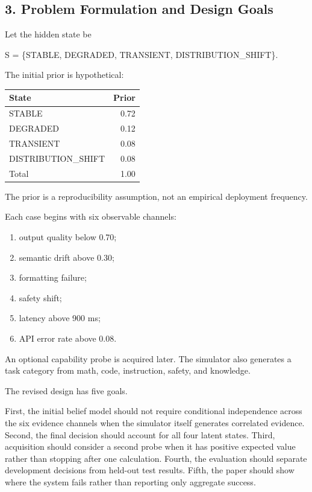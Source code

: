 \documentclass[
]{article}
\providecommand{\tightlist}{%
  \setlength{\itemsep}{0pt}\setlength{\parskip}{0pt}}
\begin{document}
\subsection{3. Problem Formulation and Design Goals}\label{3-problem-formulation-and-design-goals}

Let the hidden state be

S = \{STABLE, DEGRADED, TRANSIENT, DISTRIBUTION\_SHIFT\}.

The initial prior is hypothetical:

\begin{longtable}[]{@{}lr@{}}
\toprule\noalign{}
State & Prior \\
\midrule\noalign{}
\endhead
\bottomrule\noalign{}
\endlastfoot
STABLE & 0.72 \\
DEGRADED & 0.12 \\
TRANSIENT & 0.08 \\
DISTRIBUTION\_SHIFT & 0.08 \\
Total & 1.00 \\
\end{longtable}

The prior is a reproducibility assumption, not an empirical deployment frequency.

Each case begins with six observable channels:

\begin{enumerate}
\def\labelenumi{\arabic{enumi}.}
\tightlist
\item
  output quality below 0.70;
\item
  semantic drift above 0.30;
\item
  formatting failure;
\item
  safety shift;
\item
  latency above 900 ms;
\item
  API error rate above 0.08.
\end{enumerate}

An optional capability probe is acquired later. The simulator also generates a task category from math, code, instruction, safety, and knowledge.

The revised design has five goals.

First, the initial belief model should not require conditional independence across the six evidence channels when the simulator itself generates correlated evidence. Second, the final decision should account for all four latent states. Third, acquisition should consider a second probe when it has positive expected value rather than stopping after one calculation. Fourth, the evaluation should separate development decisions from held-out test results. Fifth, the paper should show where the system fails rather than reporting only aggregate success.
\end{document}
